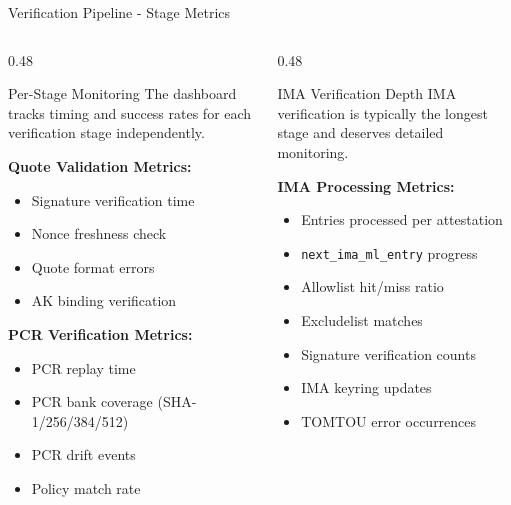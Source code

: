 \begin{frame}{Verification Pipeline - Stage Metrics}
  \begin{columns}[T]
    \begin{column}{0.48\textwidth}
      \begin{block}{Per-Stage Monitoring}
        \scriptsize
        The dashboard tracks timing and success rates for each verification stage independently.
      \end{block}

      \vspace{0.1cm}
      \scriptsize

      \textbf{Quote Validation Metrics:}
      \begin{itemize}
        \item Signature verification time
        \item Nonce freshness check
        \item Quote format errors
        \item AK binding verification
      \end{itemize}

      \vspace{0.15cm}

      \textbf{PCR Verification Metrics:}
      \begin{itemize}
        \item PCR replay time
        \item PCR bank coverage (SHA-1/256/384/512)
        \item PCR drift events
        \item Policy match rate
      \end{itemize}
    \end{column}
    \begin{column}{0.48\textwidth}
      \begin{block}{IMA Verification Depth}
        \scriptsize
        IMA verification is typically the longest stage and deserves detailed monitoring.
      \end{block}

      \vspace{0.1cm}
      \scriptsize

      \textbf{IMA Processing Metrics:}
      \begin{itemize}
        \item Entries processed per attestation
        \item \texttt{next\_ima\_ml\_entry} progress
        \item Allowlist hit/miss ratio
        \item Excludelist matches
        \item Signature verification counts
        \item IMA keyring updates
        \item TOMTOU error occurrences
      \end{itemize}


\end{column}
\end{columns}
\end{frame}
